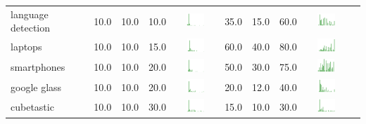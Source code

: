 \begin{table}[t]
\begin{center}
\begin{tabular}{| p{2cm} | p{1cm} | p{1cm} | p{1cm} | c | p{2cm} | p{1cm} | p{1cm} | p{1cm} | c |}
language detection & 10.0 & 10.0 & 10.0 & \includegraphics[width = 2cm, height = 0.5cm]{tex-inputs/appendix/riskbenefit-images/languagedetectionrisk} & 35.0 & 15.0 & 60.0 & \includegraphics[width = 2cm, height = 0.5cm]{tex-inputs/appendix/riskbenefit-images/languagedetectionben} \\ 
laptops & 10.0 & 10.0 & 15.0 & \includegraphics[width = 2cm, height = 0.5cm]{tex-inputs/appendix/riskbenefit-images/laptopsrisk} & 60.0 & 40.0 & 80.0 & \includegraphics[width = 2cm, height = 0.5cm]{tex-inputs/appendix/riskbenefit-images/laptopsben} \\ 
smartphones & 10.0 & 10.0 & 20.0 & \includegraphics[width = 2cm, height = 0.5cm]{tex-inputs/appendix/riskbenefit-images/smartphonesrisk} & 50.0 & 30.0 & 75.0 & \includegraphics[width = 2cm, height = 0.5cm]{tex-inputs/appendix/riskbenefit-images/smartphonesben} \\ 
google glass & 10.0 & 10.0 & 20.0 & \includegraphics[width = 2cm, height = 0.5cm]{tex-inputs/appendix/riskbenefit-images/googleglassrisk} & 20.0 & 12.0 & 40.0 & \includegraphics[width = 2cm, height = 0.5cm]{tex-inputs/appendix/riskbenefit-images/googleglassben} \\ 
cubetastic & 10.0 & 10.0 & 30.0 & \includegraphics[width = 2cm, height = 0.5cm]{tex-inputs/appendix/riskbenefit-images/cubetasticrisk} & 15.0 & 10.0 & 30.0 & \includegraphics[width = 2cm, height = 0.5cm]{tex-inputs/appendix/riskbenefit-images/cubetasticben} \\ 

\end{tabular}
\end{center}
\end{table}
